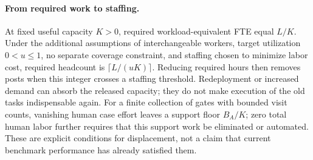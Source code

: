 \paragraph{From required work to staffing.}
At fixed useful capacity $K>0$, required workload-equivalent FTE equal $L/K$. Under the
additional assumptions of interchangeable workers, target utilization $0<u\le1$, no separate
coverage constraint, and staffing chosen to minimize labor cost, required headcount is
$\lceil L/(uK)\rceil$. Reducing required hours then removes posts when this integer crosses
a staffing threshold. Redeployment or increased demand can absorb the released capacity;
they do not make execution of the old tasks indispensable again. For a finite collection
of gates with bounded visit counts, vanishing human case effort leaves a support floor
$B_A/K$; zero total human labor further requires that this support work be eliminated or
automated. These are explicit conditions for displacement, not a claim that current
benchmark performance has already satisfied them.
